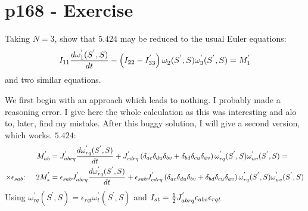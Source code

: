 \section{p168 - Exercise}
\begin{tcolorbox}
Taking $N=3$, show that $\mathbf{5.424}$ may be reduced to the usual Euler equations:
$$ I_{11}\dv{\omega^{'}_1(S^{'},S)}{t}-\left(I_{22}-I^{'}_{33}\right)\omega^{}_2(S^{'},S)\omega^{'}_3(S^{'},S)=M^{'}_1$$ and two similar equations.
\end{tcolorbox}
We first begin with an approach which leads to nothing. I probably made a reasoning error. I give here the whole calculation as this was interesting and alo to, later, find my mistake. After this buggy solution, I will give a second version, which works.
$\mathbf{5.424}$:
\begin{align}
M^{'}_{ab}&=J^{'}_{abrq}\dv{\omega^{'}_{rq}(S^{'},S)}{t}+J^{'}_{cdrq}\left(\delta_{ac}\delta_{du}\delta_{bv}+\delta_{bd}\delta_{cu}\delta_{av}\right)\omega^{'}_{rq}(S^{'},S)\omega^{'}_{uv}(S^{'},S) =\\
\times \epsilon_{sab} \text{: }\quad 2M^{'}_{s}&=\epsilon_{sab }J^{'}_{abrq}\dv{\omega^{'}_{rq}(S^{'},S)}{t}+\epsilon_{sab}J^{'}_{cdrq}\left(\delta_{ac}\delta_{du}\delta_{bv}+\delta_{bd}\delta_{cu}\delta_{av}\right)\omega^{'}_{rq}(S^{'},S)\omega^{'}_{uv}(S^{'},S) 
\end{align}
Using $ \omega^{'}_{rq}(S^{'},S)= \epsilon_{rqt}\omega^{'}_{t}(S^{'},S)$ and $I_{st}=\frac{1}{2} J^{'}_{abrq}\epsilon_{abs}\epsilon_{rqt}$
